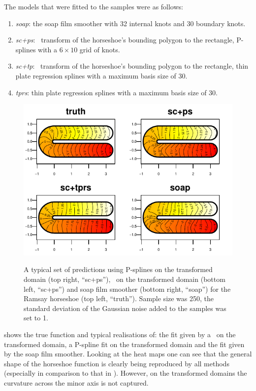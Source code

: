 The models that were fitted to the samples were as follows:
\begin{enumerate}
\item \textit{soap}: the soap film smoother with 32 internal knots and 30 boundary knots.
\item \textit{sc+ps}: \sch\ transform of the horseshoe's bounding polygon to the rectangle, P-splines with a $6 \times 10$ grid of knots.
\item \textit{sc+tp}: \sch\ transform of the horseshoe's bounding polygon to the rectangle, thin plate regression splines with a maximum basis size of 30.
\item \textit{tprs}: thin plate regression splines with a maximum basis size of 30.
\end{enumerate}

\begin{figure}[t]
\centering
\includegraphics[width=\textwidth]{sc/figs/compsmooth.pdf} \\
\caption{A typical set of predictions using P-splines on the transformed domain (top right, ``sc+ps''), \tprss\ on the transformed domain (bottom left, ``sc+ps'') and soap film smoother (bottom right, ``soap'') for the Ramsay horseshoe (top left, ``truth''). Sample size was 250, the standard deviation of the Gaussian noise added to the samples was set to 1.}
\label{compsmooth}
\end{figure}

 shows the true function and typical realisations of: the fit given by a \tprs\ on the transformed domain, a P-spline fit on the transformed domain and the fit given by the soap film smoother. Looking at the heat maps one can see that the general shape of the horseshoe function is clearly being reproduced by all methods (especially in comparison to that in ). However, on the transformed domains the curvature across the minor axis is not captured.

